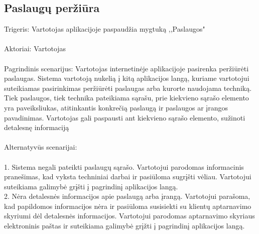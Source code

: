\documentclass[oneside]{VUMIFPSkursinis}
\begin{document}
\subsection{Paslaugų peržiūra}
	Trigeris: Vartotojas aplikacijoje paspaudžia mygtuką ,,Paslaugos"\\ \\
	Aktoriai: Vartotojas\\ \\
	Pagrindinis scenarijus: Vartotojas internetinėje aplikacijoje pasirenka peržiūrėti paslaugas. Sistema vartotoją nukelią į kitą aplikacijos langą, kuriame vartotojui suteikiamas pasirinkimas peržiūrėti paslaugas arba kurorte naudojama techniką. Tiek paslaugos, tiek technika pateikiama sąrašu, prie kiekvieno sąrašo elemento yra paveiksliukas, atitinkantis konkrečią paslaugą ir paslaugos ar įrangos pavadinimas. Vartotojas gali paspausti ant kiekvieno sąrašo elemento, sužinoti detalesnę informaciją\\ \\
Alternatyvūs scenarijai:\\ \\
1. Sistema negali pateikti paslaugų sąrašo. Vartotojui parodomas informacinis pranešimas, kad vyksta techniniai darbai ir pasiūloma sugrįšti vėliau. Vartotojui suteikiama galimybė grįšti į pagrindinį aplikacijos langą.\\
2. Nėra detalesnės informacijos apie paslaugą arba įrangą. Vartotojui parašoma, kad papildomos informacijos nėra ir pasiūloma susisiekti su klientų aptarnavimo skyriumi dėl detalesnės informacijos. Vartotojui parodomas aptarnavimo skyriaus elektroninis paštas ir suteikiama galimybė grįžti į pagrindinį aplikacijos langą.
\end{document}
